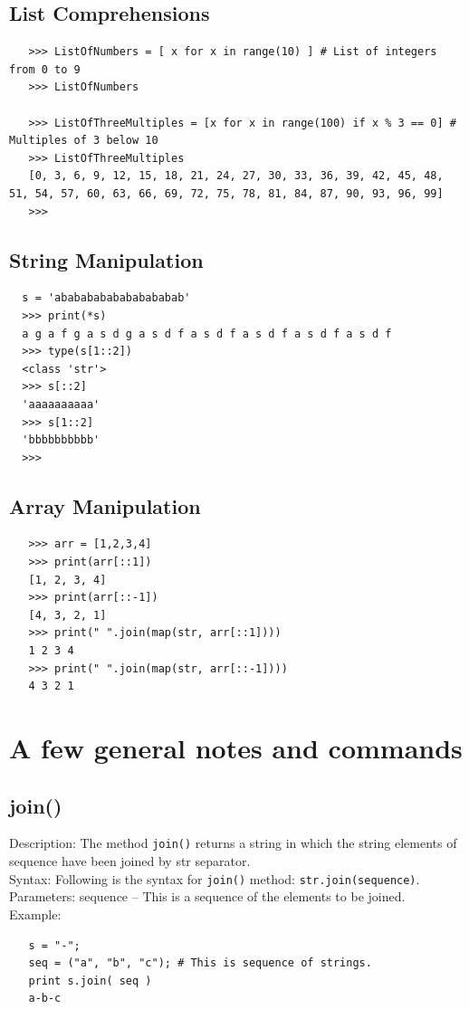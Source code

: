 \documentclass[11pt,a4paper]{article}
\begin{document}
    \subsection{List Comprehensions}
    \begin{lstlisting}
   >>> ListOfNumbers = [ x for x in range(10) ] # List of integers from 0 to 9
   >>> ListOfNumbers

   >>> ListOfThreeMultiples = [x for x in range(100) if x % 3 == 0] # Multiples of 3 below 10
   >>> ListOfThreeMultiples
   [0, 3, 6, 9, 12, 15, 18, 21, 24, 27, 30, 33, 36, 39, 42, 45, 48, 51, 54, 57, 60, 63, 66, 69, 72, 75, 78, 81, 84, 87, 90, 93, 96, 99]
   >>> 
  \end{lstlisting}  


    \subsection{String Manipulation}
    \begin{lstlisting}
  s = 'abababababababababab'
  >>> print(*s)
  a g a f g a s d g a s d f a s d f a s d f a s d f a s d f
  >>> type(s[1::2])
  <class 'str'>
  >>> s[::2]
  'aaaaaaaaaa'
  >>> s[1::2]
  'bbbbbbbbbb'
  >>> 
  \end{lstlisting}  



    \subsection{Array Manipulation}
    \begin{lstlisting}
   >>> arr = [1,2,3,4]
   >>> print(arr[::1])
   [1, 2, 3, 4]
   >>> print(arr[::-1])
   [4, 3, 2, 1]
   >>> print(" ".join(map(str, arr[::1])))
   1 2 3 4
   >>> print(" ".join(map(str, arr[::-1])))
   4 3 2 1
  \end{lstlisting}  



 \newpage
\section{A few general notes and commands}
    \subsection{join()}
    Description: The method {\tt join()} returns a string in which the string elements of sequence have been joined by str separator.\\
    Syntax: Following is the syntax for {\tt join()} method: {\tt str.join(sequence)}. \\
    Parameters: sequence -- This is a sequence of the elements to be joined. \\
    Example: 
    \begin{lstlisting}
   s = "-";
   seq = ("a", "b", "c"); # This is sequence of strings.
   print s.join( seq )
   a-b-c
  \end{lstlisting}
\end{document}

